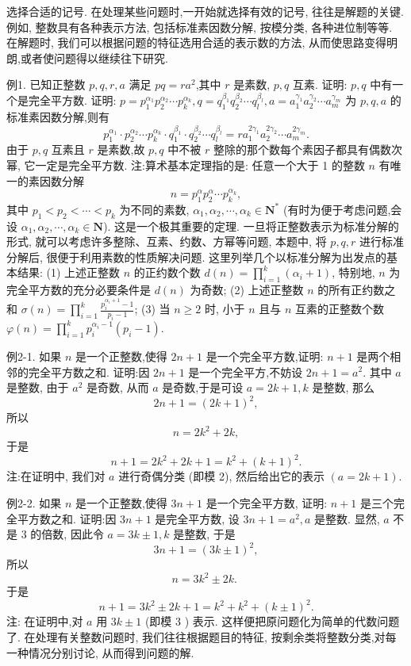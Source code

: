 
选择合适的记号.
在处理某些问题时,一开始就选择有效的记号, 往往是解题的关键.
例如, 整数具有各种表示方法, 包括标准素因数分解, 按模分类, 各种进位制等等.
在解题时, 我们可以根据问题的特征选用合适的表示数的方法, 从而使思路变得明朗,或者使问题得以继续往下研究.



例1. 已知正整数 $p, q, r, a$ 满足 $p q=r a^2$,其中 $r$ 是素数, $p, q$ 互素.
证明: $p, q$ 中有一个是完全平方数.
证明: $p=p_1^{\alpha_1} p_2^{\alpha_2} \cdots p_k^{\alpha_k}, q=q_1^{\beta_1} q_2^{\beta_2} \cdots q_l^{\beta_l}, a=a_1^{\gamma_1} a_2^{\gamma_2} \cdots a_m^{\gamma_m}$ 为 $p, q, a$ 的标准素因数分解,则有
$$
p_1^{\alpha_1} \cdot p_2^{\alpha_2} \cdots p_k^{\alpha_k} \cdot q_1^{\beta_1} \cdot q_2^{\beta_2} \cdots q_l^{\beta_l}=r a_1^{2 \gamma_1} a_2^{2 \gamma_2} \cdots a_m^{2 \gamma_m} .
$$
由于 $p, q$ 互素且 $r$ 是素数,故 $p, q$ 中不被 $r$ 整除的那个数每个素因子都具有偶数次幂, 它一定是完全平方数.
注:算术基本定理指的是: 任意一个大于 1 的整数 $n$ 有唯一的素因数分解
$$
n=p_1^\alpha p_2^\alpha \cdots p_k^{\alpha_k},
$$
其中 $p_1<p_2<\cdots<p_k$ 为不同的素数, $\alpha_1, \alpha_2, \cdots, \alpha_k \in \mathbf{N}^*$ (有时为便于考虑问题,会设 $\alpha_1, \alpha_2, \cdots, \alpha_k \in \mathbf{N}$).
这是一个极其重要的定理.
一旦将正整数表示为标准分解的形式, 就可以考虑许多整除、互素、约数、方幂等问题, 本题中, 将 $p, q, r$ 进行标准分解后, 很便于利用素数的性质解决问题.
这里列举几个以标准分解为出发点的基本结果:
(1) 上述正整数 $n$ 的正约数个数 $d(n)=\prod_{i=1}^k\left(\alpha_i+1\right)$, 特别地, $n$ 为完全平方数的充分必要条件是 $d(n)$ 为奇数;
(2) 上述正整数 $n$ 的所有正约数之和 $\sigma(n)=\prod_{i=1}^k \frac{p_i^{\alpha_i+1}-1}{p_i-1}$;
(3) 当 $n \geqslant 2$ 时, 小于 $n$ 且与 $n$ 互素的正整数个数 $\varphi(n)=\prod_{i=1}^k p_i^{\alpha_i-1}\left(p_i-1\right)$.



例2-1. 如果 $n$ 是一个正整数,使得 $2 n+1$ 是一个完全平方数,证明: $n+1$ 是两个相邻的完全平方数之和.
证明:因 $2 n+1$ 是一个完全平方,不妨设 $2 n+1=a^2$. 其中 $a$ 是整数, 由于 $a^2$ 是奇数, 从而 $a$ 是奇数,于是可设 $a=2 k+1, k$ 是整数, 那么
$$
2 n+1=(2 k+1)^2,
$$
所以
$$
n=2 k^2+2 k,
$$
于是
$$
n+1=2 k^2+2 k+1=k^2+(k+1)^2 .
$$
注:在证明中, 我们对 $a$ 进行奇偶分类 (即模 2), 然后给出它的表示 $(a=2 k+1)$.



例2-2. 如果 $n$ 是一个正整数,使得 $3 n+1$ 是一个完全平方数, 证明: $n+1$ 是三个完全平方数之和.
证明:因 $3 n+1$ 是完全平方数, 设 $3 n+1=a^2, a$ 是整数.
显然, $a$ 不是 3 的倍数, 因此令 $a=3 k \pm 1, k$ 是整数, 于是
$$
3 n+1=(3 k \pm 1)^2,
$$
所以
$$
n=3 k^2 \pm 2 k \text {. }
$$
于是
$$
n+1=3 k^2 \pm 2 k+1=k^2+k^2+(k \pm 1)^2 .
$$
注: 在证明中,对 $a$ 用 $3 k \pm 1$ (即模 3 ) 表示.
这样便把原问题化为简单的代数问题了.
在处理有关整数问题时, 我们往往根据题目的特征, 按剩余类将整数分类,对每一种情况分别讨论, 从而得到问题的解.



